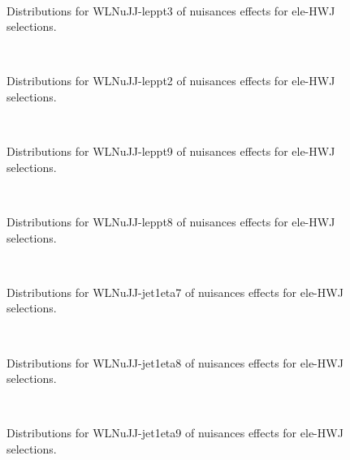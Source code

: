 \begin{figure}[htbp]  
\centering 
\\ 
\caption{ 
   Distributions for WLNuJJ-leppt3 of nuisances effects for ele-HWJ selections.
} 
\label{fig:WLNuJJ_leppt3_ele_HWJ} 
\end{figure} 




\begin{figure}[htbp]  
\centering 
\\ 
\caption{ 
   Distributions for WLNuJJ-leppt2 of nuisances effects for ele-HWJ selections.
} 
\label{fig:WLNuJJ_leppt2_ele_HWJ} 
\end{figure} 




\begin{figure}[htbp]  
\centering 
\\ 
\caption{ 
   Distributions for WLNuJJ-leppt9 of nuisances effects for ele-HWJ selections.
} 
\label{fig:WLNuJJ_leppt9_ele_HWJ} 
\end{figure} 




\begin{figure}[htbp]  
\centering 
\\ 
\caption{ 
   Distributions for WLNuJJ-leppt8 of nuisances effects for ele-HWJ selections.
} 
\label{fig:WLNuJJ_leppt8_ele_HWJ} 
\end{figure} 




\begin{figure}[htbp]  
\centering 
\\ 
\caption{ 
   Distributions for WLNuJJ-jet1eta7 of nuisances effects for ele-HWJ selections.
} 
\label{fig:WLNuJJ_jet1eta7_ele_HWJ} 
\end{figure} 




\begin{figure}[htbp]  
\centering 
\\ 
\caption{ 
   Distributions for WLNuJJ-jet1eta8 of nuisances effects for ele-HWJ selections.
} 
\label{fig:WLNuJJ_jet1eta8_ele_HWJ} 
\end{figure} 




\begin{figure}[htbp]  
\centering 
\\ 
\caption{ 
   Distributions for WLNuJJ-jet1eta9 of nuisances effects for ele-HWJ selections.
} 
\label{fig:WLNuJJ_jet1eta9_ele_HWJ} 
\end{figure} 




